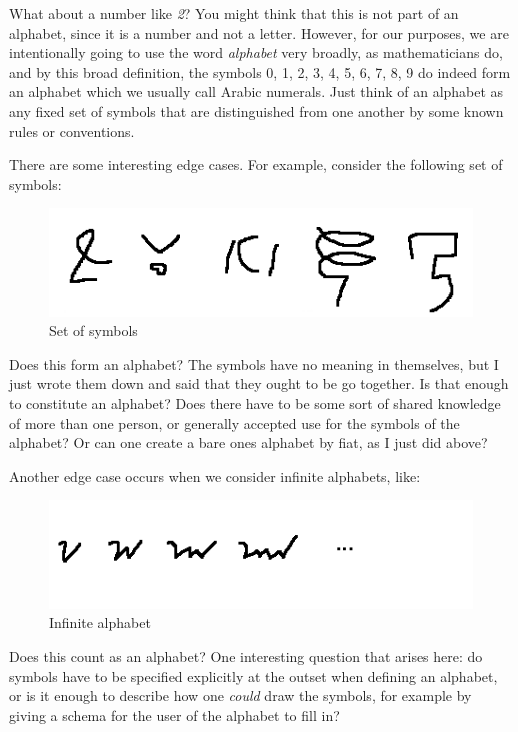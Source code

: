 \documentclass[UTF8]{book}
\begin{document}
\begin{CJK}{UTF8}{gbsn}
What about a number like \emph{2}? You might think that this is not part of an alphabet, since it is a number and not a letter. However, for our purposes, we are intentionally going to use the word \emph{alphabet} very broadly, as mathematicians do, and by this broad definition, the symbols 0, 1, 2, 3, 4, 5, 6, 7, 8, 9 do indeed form an alphabet which we usually call Arabic numerals. Just think of an alphabet as any fixed set of symbols that are distinguished from one another by some known rules or conventions.

There are some interesting edge cases. For example, consider the following set of symbols:

\begin{figure}[H]
\centering
\includegraphics[width=0.8\linewidth]{random-symbols}
\caption{Set of symbols}
\end{figure}

Does this form an alphabet? The symbols have no meaning in themselves, but I just wrote them down and said that they ought to be go together. Is that enough to constitute an alphabet? Does there have to be some sort of shared knowledge of more than one person, or generally accepted use for the symbols of the alphabet? Or can one create a bare ones alphabet by fiat, as I just did above?

Another edge case occurs when we consider infinite alphabets, like:

\begin{figure}[H]
\centering
\includegraphics[width=0.8\linewidth]{infinite-alphabet}
\caption{Infinite alphabet}
\end{figure}

Does this count as an alphabet? One interesting question that arises here: do symbols have to be specified explicitly at the outset when defining an alphabet, or is it enough to describe how one \emph{could} draw the symbols, for example by giving a schema for the user of the alphabet to fill in?


\end{CJK}
\end{document}
